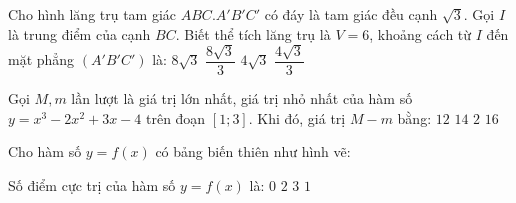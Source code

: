 \begin{ex}%
	Cho hình lăng trụ tam giác $ ABC.A'B'C' $ có đáy là tam giác đều cạnh $ \sqrt{3} $. Gọi $ I $ là trung điểm của cạnh $ BC $. Biết thể tích lăng trụ là $ V=6 $, khoảng cách từ $ I $ đến mặt phẳng $ (A'B'C') $ là:
	\choice
	{$ 8\sqrt{3} $}
	{\True $ \dfrac{8\sqrt{3}}{3} $}
	{$ 4\sqrt{3} $}
	{$ \dfrac{4\sqrt{3}}{3} $}
\end{ex}
\begin{ex}%
	Gọi $ M,m $ lần lượt là giá trị lớn nhất, giá trị nhỏ nhất của hàm số $ y=x^3-2x^2+3x-4 $ trên đoạn $ [1;3] .$ Khi đó, giá trị $ M-m $ bằng:
	\choice
	{$ 12 $}
	{$ 14 $}
	{$ 2 $}
	{\True $ 16 $}
\end{ex}
\begin{ex}%
	Cho hàm số $ y=f(x) $ có bảng biến thiên như hình vẽ:\\
	\begin{center}
		
	\end{center}
	 Số điểm cực trị của hàm số $ y=f(x) $ là:
	\choice
	{$ 0 $}
	{$ 2 $}
	{$ 3 $}
	{\True $ 1 $}
	\loigiai{}
\end{ex}
